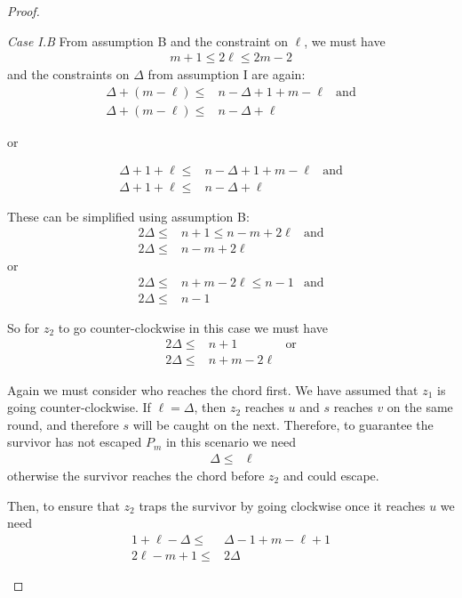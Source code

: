 \begin{proof}
\begin{proofpart}
  \textit{Case I.B}
  From assumption B and the constraint on $\ell$, we must have
  \begin{align*}
   m + 1 \leq 2 \ell \leq 2m - 2
  \end{align*}
  and the constraints on $\Delta$ from assumption I are again:
  \begin{align*}
   \Delta + (m - \ell) \leq & n - \Delta + 1 + m - \ell & \text{and} \\
   \Delta + (m - \ell) \leq & n - \Delta + \ell
  \end{align*}
  \begin{center}or\end{center}
  \begin{align*}
   \Delta + 1 + \ell \leq & n - \Delta + 1 + m - \ell & \text{and} \\
   \Delta + 1 + \ell \leq & n - \Delta + \ell
  \end{align*}

  These can be simplified using assumption B:
  \begin{align*}
   2 \Delta \leq & n+1 \leq n-m+2\ell & \text{and} \\
   2 \Delta \leq & n - m + 2\ell
  \end{align*}
  or
  \begin{align*}
   2 \Delta \leq & n+m -2 \ell \leq n-1 & \text{and} \\
   2 \Delta \leq & n -1
  \end{align*}

  So for $z_2$ to go counter-clockwise in this case we must have
  \begin{align*}
   2 \Delta \leq & n + 1         & \text{or} \\
   2 \Delta \leq & n + m - 2\ell
  \end{align*}

  Again we must consider who reaches the chord first. We have assumed that $z_1$
  is going counter-clockwise. If $\ell = \Delta$, then $z_2$ reaches $u$ and $s$
  reaches $v$ on the same round, and therefore $s$ will be caught on the next.
  Therefore, to guarantee the survivor has not escaped $P_m$ in this scenario we need
  \begin{align*}
   \Delta \leq & \ell
  \end{align*}
  otherwise the survivor reaches the chord before $z_2$ and could escape.

  Then, to ensure that $z_2$ traps the survivor by going clockwise once
  it reaches $u$ we need
  \begin{align*}
   1 + \ell - \Delta \leq & \Delta -1 + m - \ell + 1 \\
   2\ell - m + 1 \leq     & 2 \Delta
  \end{align*}


\end{proofpart}
\end{proof}
